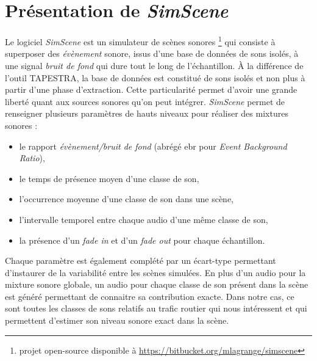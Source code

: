 \section{Présentation de \textit{SimScene}}
Le logiciel \textit{SimScene} \cite{rossignol_simscene:_2015} est un simulateur de scènes sonores \footnote{projet open-source disponible à \url{https://bitbucket.org/mlagrange/simscene}} qui consiste à superposer des \textit{évènement} sonore, issus d'une base de données de sons isolés, à une signal \textit{bruit de fond} qui dure tout le long de l'échantillon. À la différence de l'outil TAPESTRA, la base de données est constitué de sons isolés et non plus à partir d'une phase d'extraction. Cette particularité permet d'avoir une grande liberté quant aux sources sonores qu'on peut intégrer. \textit{SimScene} permet de renseigner plusieurs paramètres de hauts niveaux pour réaliser des mixtures sonores : 

\begin{itemize}
\item le rapport \textit{évènement/bruit de fond} (abrégé ebr pour \textit{Event Background Ratio}),
\item le temps de présence moyen d'une classe de son,
\item l'occurrence moyenne d'une classe de son dans une scène, 
\item l'intervalle temporel entre chaque audio d'une même classe de son,
\item la présence d'un \textit{fade in} et d'un \textit{fade out} pour chaque échantillon.\\
\end{itemize}

Chaque paramètre est également complété par un écart-type permettant d'instaurer de la variabilité entre les scènes simulées. En plus d'un audio pour la mixture sonore globale, un audio pour chaque classe de son présent dans la scène est généré permettant de connaitre sa contribution exacte. Dans notre cas, ce sont toutes les classes de sons relatifs au trafic routier qui nous intéressent et qui permettent d'estimer son niveau sonore exact dans la scène.\\



